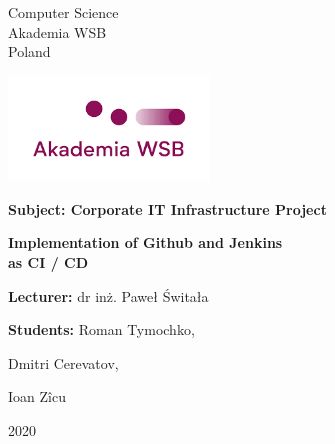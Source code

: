 \documentclass[12pt,a4paper,twoside]{article}
\begin{document}
\fontsize{14pt}{14pt}\selectfont
\begin{titlepage}
 \begin{center}
       Computer Science\\
       Akademia WSB\\
       Poland\\

      \vspace*{2cm}

      \includegraphics[width=0.4\textwidth]{images-aws/university}

       \vspace*{3cm}
      
       \textbf{Subject: Corporate IT Infrastructure Project}
 
       \begin{center}
	\Large\textbf{Implementation of Github and Jenkins \\ as CI / CD}\\
       \end{center}

       \vspace{0.5cm}
        
            
       \vspace{1.5cm}


       \mbox{}\hfill \textbf{Lecturer:}  dr inż. Paweł Świtała

       {\raggedleft \textbf{Students:} Roman Tymochko, \par}
       {\raggedleft Dmitri Cerevatov,       \par}
       {\raggedleft Ioan Zîcu                    \par}


       \vfill
            

       \vspace{2cm}
     
       2020
            
   \end{center}
\end{titlepage}

\newpage

\fontsize{12pt}{12pt}\selectfont


\tableofcontents
\end{document}
